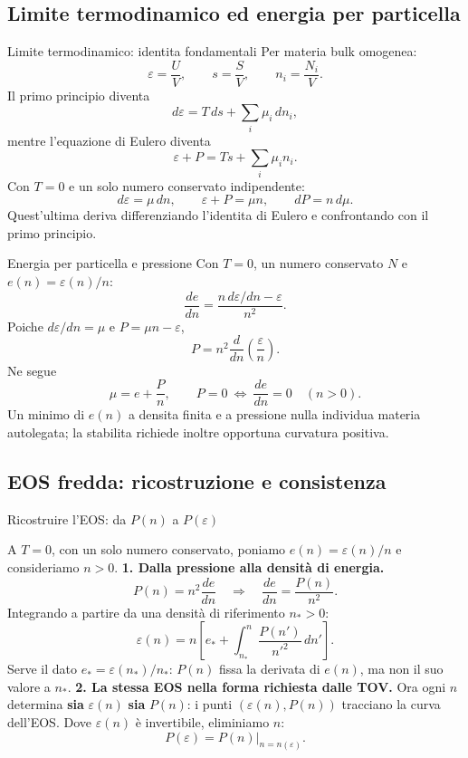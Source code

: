 \subsection{Limite termodinamico ed energia per particella}

\begin{frame}[t]{Limite termodinamico: identita fondamentali}
\vspace*{3mm}
\small
Per materia bulk omogenea:
\[
\varepsilon=\frac UV,\qquad s=\frac SV,\qquad n_i=\frac{N_i}{V}.
\]
Il primo principio diventa
\[
d\varepsilon=T\,ds+\sum_i\mu_i\,dn_i,
\]
mentre l'equazione di Eulero diventa
\[
\boxed{\varepsilon+P=Ts+\sum_i\mu_i n_i.}
\]
Con $T=0$ e un solo numero conservato indipendente:
\[
d\varepsilon=\mu\,dn,\qquad
\varepsilon+P=\mu n,\qquad dP=n\,d\mu.
\]
Quest'ultima deriva differenziando l'identita di Eulero e confrontando con il primo principio.
\end{frame}

\begin{frame}[t]{Energia per particella e pressione}
\vspace*{3mm}
\small
Con $T=0$, un numero conservato $N$ e $e(n)=\varepsilon(n)/n$:
\[
\frac{de}{dn}=
\frac{n\,d\varepsilon/dn-\varepsilon}{n^2}.
\]
Poiche $d\varepsilon/dn=\mu$ e $P=\mu n-\varepsilon$,
\[
\boxed{P=n^2\frac{d}{dn}\!\left(\frac{\varepsilon}{n}\right).}
\]
Ne segue
\[
\mu=e+\frac{P}{n},\qquad
P=0\ \Longleftrightarrow\ \frac{de}{dn}=0\quad(n>0).
\]
Un minimo di $e(n)$ a densita finita e a pressione nulla individua materia autolegata; la stabilita richiede inoltre opportuna curvatura positiva.
\end{frame}

\subsection{EOS fredda: ricostruzione e  consistenza}

\begin{frame}[t]{Ricostruire l'EOS: da $P(n)$ a $P(\varepsilon)$}
\vspace*{3mm}
\small\raggedright
A $T=0$, con un solo numero conservato, poniamo
$e(n)=\varepsilon(n)/n$ e consideriamo $n>0$.
\smallskip
\textbf{1. Dalla pressione alla densit\`a di energia.}
\[
P(n)=n^2\frac{de}{dn}
\quad\Longrightarrow\quad
\frac{de}{dn}=\frac{P(n)}{n^2}.
\]
Integrando a partire da una densit\`a di riferimento $n_*>0$:
\[
\boxed{\varepsilon(n)=n\left[
e_*+\int_{n_*}^{n}\frac{P(n')}{n'^2}\,dn'
\right].}
\]
Serve il dato $e_*=\varepsilon(n_*)/n_*$:
$P(n)$ fissa la derivata di $e(n)$, ma non il suo valore a $n_*$.
\medskip
\textbf{2. La stessa EOS nella forma richiesta dalle TOV.}
Ora ogni $n$ determina \textbf{sia} $\varepsilon(n)$ \textbf{sia} $P(n)$:
i punti $(\varepsilon(n),P(n))$ tracciano la curva dell'EOS.
Dove $\varepsilon(n)$ \`e invertibile, eliminiamo $n$:
\[
\boxed{P(\varepsilon)
=\left.P(n)\right|_{n=n(\varepsilon)}.}
\]
\end{frame}

